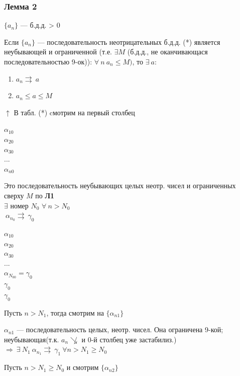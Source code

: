 \documentclass{article}
\begin{document}
    \subsubsection{Лемма 2}
    
    \(\{a_n\}\) --- б.д.д. >  0

    Если \( \{a_n\} \) --- последовательность неотрицательных б.д.д. (*) является неубывающей и ограниченной (т.е. \( \exists M \) (б.д.д., не оканчивающася последовательностью 9-ок)): \( \forall\ n\ a_n \leq M) \), то \( \exists\ a \):
    
    \begin{enumerate}
    	\item \(a_n \rightrightarrows\ a\)  

    	\item \(a_n \leq a \leq M\)
	\end{enumerate}
    
    \( \uparrow \) В табл. (*) cмотрим на первый столбец

    \( \alpha_{10} \)\\
    \( \alpha_{20} \)\\
    \( \alpha_{30} \)\\
    ...\\
    \( \alpha_{n0} \)

    Это последовательность неубывающих целых неотр. чисел и ограниченных сверху \(M\) по \textbf{Л1}\\
    \(\exists \) номер \(N_0\) \: \(\forall\ n > N_0\)\\
    \(\ \alpha_{n_0} \rightrightarrows\ \gamma_0\)
    
    \( \alpha_{10} \)\\
    \( \alpha_{20} \)\\
    \( \alpha_{30} \)\\
    ...\\
    \( \alpha_{N_00} = \gamma_0 \)\\
    \(\gamma_0\)\\
    \(\gamma_0\)

    Пусть \(n > N_1\), тогда смотрим на \(\{\alpha_{n1}\}\)

    \(\alpha_{n1}\) --- последовательность целых, неотр. чисел. Она ограничена 9-кой; неубывающая(т.к. \(a_n \not\searrow\) и 0-й столбец уже застабилиз.) \(\Rightarrow \ \exists\ N_1 \ \alpha_{n_1} \rightrightarrows\ \gamma_1 \ \forall n > N_1 \geq N_0\)

    Пусть \( n > N_1 \geq N_0 \) и смотрим \( \{ \alpha_{n2} \} \)
    
\end{document}
